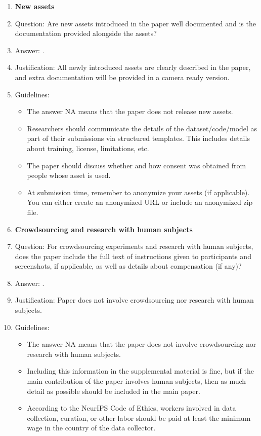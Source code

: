 \documentclass{article}
\begin{document}
{\begin{enumerate}
\item {\bf New assets}
    \item[] Question: Are new assets introduced in the paper well documented and is the documentation provided alongside the assets?
    \item[] Answer: \answerYes{}.
    \item[] Justification: All newly introduced assets are clearly described in the paper, and extra documentation will be provided in a camera ready version.
    \item[] Guidelines:
    \begin{itemize}
        \item The answer NA means that the paper does not release new assets.
        \item Researchers should communicate the details of the dataset/code/model as part of their submissions via structured templates. This includes details about training, license, limitations, etc. 
        \item The paper should discuss whether and how consent was obtained from people whose asset is used.
        \item At submission time, remember to anonymize your assets (if applicable). You can either create an anonymized URL or include an anonymized zip file.
    \end{itemize}

\item {\bf Crowdsourcing and research with human subjects}
    \item[] Question: For crowdsourcing experiments and research with human subjects, does the paper include the full text of instructions given to participants and screenshots, if applicable, as well as details about compensation (if any)? 
    \item[] Answer: \answerNA{}.
    \item[] Justification: Paper does not involve crowdsourcing nor research with human subjects.
    \item[] Guidelines:
    \begin{itemize}
        \item The answer NA means that the paper does not involve crowdsourcing nor research with human subjects.
        \item Including this information in the supplemental material is fine, but if the main contribution of the paper involves human subjects, then as much detail as possible should be included in the main paper. 
        \item According to the NeurIPS Code of Ethics, workers involved in data collection, curation, or other labor should be paid at least the minimum wage in the country of the data collector. 
    \end{itemize}


\end{enumerate}}
\end{document}
